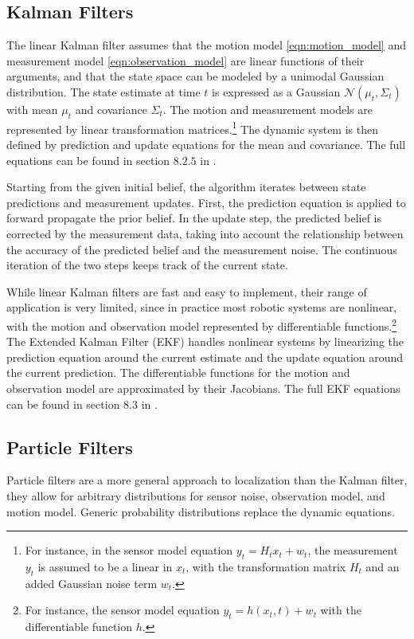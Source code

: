 \documentclass[10pt,journal,compsoc]{IEEEtran}
\begin{document}
\subsection{Kalman Filters}
The linear Kalman filter assumes that the motion model \ref{eqn:motion_model} and measurement model \ref{eqn:observation_model} are linear functions of their arguments, and that the state space can be modeled by a unimodal Gaussian distribution. The state estimate at time $t$ is expressed as a Gaussian $\mathcal{N}\left(\mu_t , \Sigma_t \right)$ with mean $\mu_t$ and covariance $\Sigma_t$. The motion and measurement models are represented by linear transformation matrices.\footnote{For instance, in the sensor model equation $y_t  = H_t x_t + w_t$, the measurement $y_t$ is assumed to be a linear in $x_t$, with the transformation matrix $H_t$ and an added Gaussian noise term $w_t$.} The dynamic system is then defined by prediction and update equations for the mean and covariance. The full equations can be found in section $8.2.5$ in \cite{principles_of_robot_motion}.

Starting from the given initial belief, the algorithm iterates between state predictions and measurement updates. First, the prediction equation is applied to forward propagate the prior belief. In the update step, the predicted belief is corrected by the measurement data, taking into account the relationship between the accuracy of the predicted belief and the measurement noise. The continuous iteration of the two steps keeps track of the current state.

While linear Kalman filters are fast and easy to implement, their range of application is very limited, since in practice most robotic systems are nonlinear, with the motion and observation model represented by differentiable functions.\footnote{For instance, the sensor model equation $y_t = h\left(x_t, t \right) + w_t$ with the differentiable function $h$.} The Extended Kalman Filter (EKF) handles nonlinear systems by linearizing the prediction equation around the current estimate and the update equation around the current prediction. The differentiable functions for the motion and observation model are approximated by their Jacobians. The full EKF equations can be found in section $8.3$ in \cite{principles_of_robot_motion}.

\subsection{Particle Filters}
Particle filters are a more general approach to localization than the Kalman filter, they allow for arbitrary distributions for sensor noise, observation model, and motion model. Generic probability distributions replace the dynamic equations.
\end{document}
